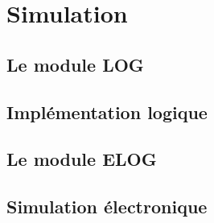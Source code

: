 \chapter{Simulation}

	\section{Le module LOG}

	\section{Implémentation logique}

	\section{Le module ELOG}

	\section{Simulation électronique}

	